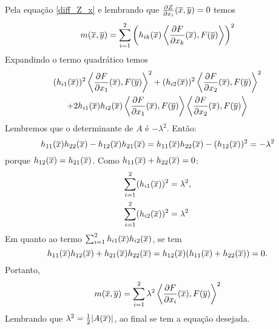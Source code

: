 \begin{demonstracao}
\begin{equation*}
	\end{equation*}	
	Pela equação \eqref{diff_Z_x} e lembrando que $\frac{\partial Z}{\partial x_i}(\overline{x},\overline{y})=0$ temos
	\begin{equation*}
	m(\overline{x},\overline{y}) = \sum_{i=1}^2 \left( h_{ik}(\overline{x}) \left\langle \frac{\partial F}{\partial x_k}(\overline{x}), F(\overline{y}) \right\rangle \right)^2
	\end{equation*}	
	Expandindo o termo quadrático temos
	\begin{multline*}
	(h_{i1}(\overline{x}))^2 \left\langle \frac{\partial F}{\partial x_1}(\overline{x}), F(\overline{y}) \right\rangle^2 + (h_{i2}(\overline{x}))^2 \left\langle \frac{\partial F}{\partial x_2}(\overline{x}), F(\overline{y}) \right\rangle^2\\
	+ 2 h_{i1}(\overline{x}) h_{i2}(\overline{x}) \left\langle \frac{\partial F}{\partial x_1}(\overline{x}), F(\overline{y}) \right\rangle \left\langle \frac{\partial F}{\partial x_2}(\overline{x}), F(\overline{y}) \right\rangle
	\end{multline*}	
	Lembremos que o determinante de $A$ é $-\lambda^2$. Então:
	\begin{equation*}
	h_{11}(\overline{x}) h_{22}(\overline{x}) - h_{12}(\overline{x}) h_{21}(\overline{x}) = h_{11}(\overline{x}) h_{22}(\overline{x}) - (h_{12}(\overline{x}))^2 = -\lambda^2
	\end{equation*}	
	porque $h_{12}(\overline{x}) = h_{21}(\overline{x})$. Como $h_{11}(\overline{x}) + h_{22}(\overline{x}) = 0$:
	\begin{align*}
	\sum_{i=1}^2 (h_{i1}(\overline{x}))^2 &= \lambda^2,\\
	\sum_{i=1}^2 (h_{i2}(\overline{x}))^2 &= \lambda^2
	\end{align*}	
	Em quanto ao termo $\sum_{i=1}^2 h_{i1}(\overline{x}) h_{i2}(\overline{x})$, se tem
	\begin{equation*}
	h_{11}(\overline{x}) h_{12}(\overline{x}) + h_{21}(\overline{x}) h_{22}(\overline{x}) = h_{12}(\overline{x}) (h_{11}(\overline{x}) + h_{22}(\overline{x})) = 0.
	\end{equation*}	
	Portanto,
	\begin{equation*}
	m(\overline{x},\overline{y}) = \sum_{i=1}^2 \lambda^2 \left\langle \frac{\partial F}{\partial x_i}(\overline{x}), F(\overline{y}) \right\rangle^2
	\end{equation*}	
	Lembrando que $\lambda^2 = \frac{1}{2} |A(\overline{x})|$, ao final se tem a equação desejada.	
\end{demonstracao}


